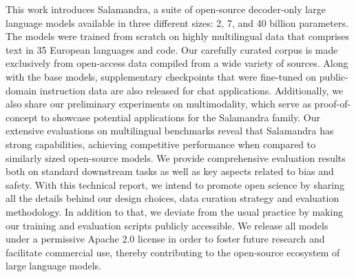 This work introduces Salamandra, a suite of open-source decoder-only large language models available in three different sizes: 2, 7, and 40 billion parameters.
The models were trained from scratch on highly multilingual data that comprises text in 35 \mbox{European} languages and code. Our carefully curated corpus is made exclusively from open-access data compiled from a wide variety of sources. 
Along with the base models, supplementary checkpoints that were fine-tuned on public-domain \mbox{instruction} data are also released for chat applications. 
Additionally, we also share our preliminary experiments on multimodality, which serve as proof-of-concept to showcase potential applications for the Salamandra family.
Our extensive evaluations on multilingual benchmarks reveal that Salamandra has strong capabilities, achieving competitive performance when compared to similarly sized open-source models. 
We provide comprehensive evaluation results both on standard downstream tasks as well as key aspects related to bias and safety.
With this technical report, we intend to promote open science by sharing all the details behind our design choices, data curation strategy and evaluation methodology.
In addition to that, we deviate from the usual practice by making our training and evaluation scripts publicly accessible.
We release all models under a permissive Apache 2.0 license in order to foster future research and facilitate commercial use, thereby contributing to the open-source ecosystem of large language models.
